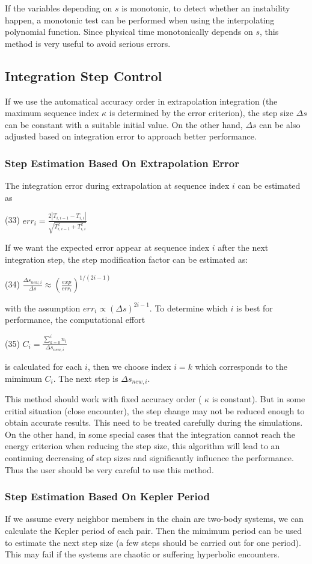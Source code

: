If the variables depending on $ s $ is monotonic, to detect whether an instability happen, a monotonic test can be performed when using the interpolating polynomial function. Since physical time monotonically depends on $ s $, this method is very useful to avoid serious errors.\hypertarget{index_step_sec}{}\subsection{Integration Step Control}\label{index_step_sec}
If we use the automatical accuracy order in extrapolation integration (the maximum sequence index $\kappa $ is determined by the error criterion), the step size $\Delta s$ can be constant with a suitable initial value. On the other hand, $ \Delta s$ can be also adjusted based on integration error to approach better performance.\hypertarget{index_step_error}{}\subsubsection{Step Estimation Based On Extrapolation Error}\label{index_step_error}
The integration error during extrapolation at sequence index $ i$ can be estimated as

(33) $ err_i = \frac{2|T_{i,i-1} - T_{i,i}|}{\sqrt{T_{i,i-1}^2 + T_{i,i}^2}}$

If we want the expected error appear at sequence index $ i$ after the next integration step, the step modification factor can be estimated as\+:

(34) $ \frac{\Delta s_{new,i}}{\Delta s} \approx \left(\frac{exp}{err_{i}}\right)^{1/(2i-1)} $

with the assumption $ err_i \propto (\Delta s)^{2i-1} $. To determine which $ i$ is best for performance, the computational effort

(35) $ C_i = \frac{\sum_{k=0}^i n_i}{\Delta s_{new,i}} $

is calculated for each $ i $, then we choose index $ i=k $ which corresponds to the mimimum $ C_i $. The next step is $ \Delta s_{new,i} $.

This method should work with fixed accuracy order ( $ \kappa $ is constant). But in some critial situation (close encounter), the step change may not be reduced enough to obtain accurate results. This need to be treated carefully during the simulations. On the other hand, in some special cases that the integration cannot reach the energy criterion when reducing the step size, this algorithm will lead to an continuing decreasing of step sizes and significantly influence the performance. Thus the user should be very careful to use this method.\hypertarget{index_step_kepler}{}\subsubsection{Step Estimation Based On Kepler Period}\label{index_step_kepler}
If we assume every neighbor members in the chain are two-\/body systems, we can calculate the Kepler period of each pair. Then the mimimum period can be used to estimate the next step size (a few steps should be carried out for one period). This may fail if the systems are chaotic or suffering hyperbolic encounters.

